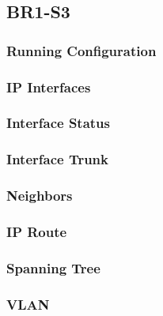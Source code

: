 \subsection{BR1-S3}
\subsubsection{Running Configuration}


\subsubsection{IP Interfaces}


\subsubsection{Interface Status}


\subsubsection{Interface Trunk}


\subsubsection{Neighbors}


\subsubsection{IP Route}


\subsubsection{Spanning Tree}


\subsubsection{VLAN}




